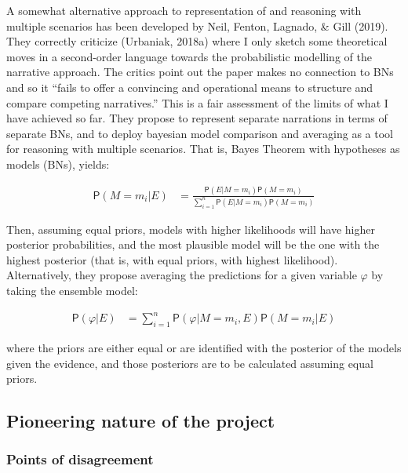 \documentclass[11pt,dvipsnames,enabledeprecatedfontcommands]{scrartcl}
\newcommand{\pr}[1]{\mathsf{P}(#1)}
\begin{document}
A somewhat alternative approach to representation of and reasoning with
multiple scenarios has been developed by Neil, Fenton, Lagnado, \& Gill
(2019). They correctly criticize (Urbaniak, 2018a) where I only sketch
some theoretical moves in a second-order language towards the
probabilistic modelling of the narrative approach. The critics point out
the paper makes no connection to BNs and so it ``fails to offer a
convincing and operational means to structure and compare competing
narratives.'' This is a fair assessment of the limits of what I have
achieved so far. They propose to represent separate narrations in terms
of separate BNs, and to deploy bayesian model comparison and averaging
as a tool for reasoning with multiple scenarios. That is, Bayes Theorem
with hypotheses as models (BNs), yields:

\vspace{-3mm}

\begin{align}
\pr{M=m_i\vert E} & = \frac{
\pr{E\vert M = m_i}\pr{M= m_i}
}
{
\sum_{i=1}^{n}\pr{E \vert M = m_i}\pr{M = m_i}
}
\end{align}

\noindent Then, assuming equal priors, models with higher likelihoods
will have higher posterior probabilities, and the most plausible model
will be the one with the highest posterior (that is, with equal priors,
with highest likelihood). Alternatively, they propose averaging the
predictions for a given variable \(\varphi\) by taking the ensemble
model:

\vspace{-3mm}

\begin{align}
\pr{\varphi \vert E} & = \sum_{i=1}^n \pr{\varphi \vert M=m_i, E} \pr{M=m_i\vert E}
\end{align}

\vspace{-2mm}

\noindent where the priors are either equal or are identified with the
posterior of the models given the evidence, and those posteriors are to
be calculated assuming equal priors.

\hypertarget{pioneering-nature-of-the-project}{%
\subsection{Pioneering nature of the
project}\label{pioneering-nature-of-the-project}}

\hypertarget{points-of-disagreement}{%
\subsubsection{Points of disagreement}\label{points-of-disagreement}}
\end{document}
